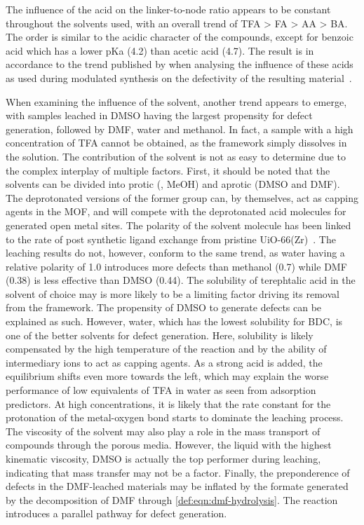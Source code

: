 The influence of the acid on the linker-to-node ratio appears to be
constant throughout the solvents used, with an overall trend of 
\gls{TFA} > \gls{FA} > \gls{AA} > \gls{BA}. The order is similar
to the acidic character of the compounds, except for
benzoic acid which has a lower pKa (4.2) than acetic acid (4.7).
The result is in accordance to the trend published by 
\citeauthor{shearerDefectEngineeringTuning2016} when analysing
the influence of these acids as used during modulated synthesis on the
defectivity of the resulting material~\cite{shearerDefectEngineeringTuning2016}.

When examining the influence of the solvent, another trend appears
to emerge, with samples leached in \gls{DMSO} having the largest propensity
for defect generation, followed by \gls{DMF}, water and methanol. In fact,
a sample with a high concentration of \gls{TFA} cannot be obtained, as the 
framework simply dissolves in the solution.
The contribution of the solvent is not as easy to determine due
to the complex interplay of multiple factors. First, it should be noted that 
the solvents can be divided into protic (, \gls{MeOH}) and
aprotic (\gls{DMSO} and \gls{DMF}). The deprotonated versions of the 
former group can, by themselves, act as capping agents in the MOF, and 
will compete with the deprotonated acid molecules for generated open metal
sites. The polarity of the solvent molecule has been linked to 
the rate of post synthetic ligand exchange from
pristine UiO-66(Zr)~\cite{kimPostsyntheticLigandExchange2012}. The leaching
results do not, however, conform to the same trend, as water having a 
relative polarity of 1.0 introduces more defects than methanol 
(0.7) while \gls{DMF} (0.38) is less effective than 
\gls{DMSO} (0.44). The solubility of terephtalic acid in the solvent 
of choice may is more likely to be a limiting factor driving its removal
from the framework. The propensity of DMSO to generate defects can be 
explained as such. However, water, which has the lowest solubility for 
\gls{BDC}, is one of the better solvents for defect generation. Here,
solubility is likely compensated by the high temperature of the reaction
and by the ability of intermediary  ions to act as capping agents.
As a strong acid is added, the equilibrium shifts even more towards the 
left, which may explain the worse performance of low equivalents 
of \gls{TFA} in water as seen from adsorption predictors. 
At high concentrations, it is likely that the rate constant for the
protonation of the metal-oxygen bond starts to dominate the leaching
process. The viscosity of the 
solvent may also play a role in the mass transport of compounds 
through the porous media. However, the liquid with the highest 
kinematic viscosity, \gls{DMSO} is actually the top performer during leaching,
indicating that mass transfer may not be a factor.
Finally, the preponderence of defects in the DMF-leached materials may be
inflated by the formate generated by the decomposition of DMF 
through \autoref{def:eqn:dmf-hydrolysis}. The reaction introduces a 
parallel pathway for defect generation. 

